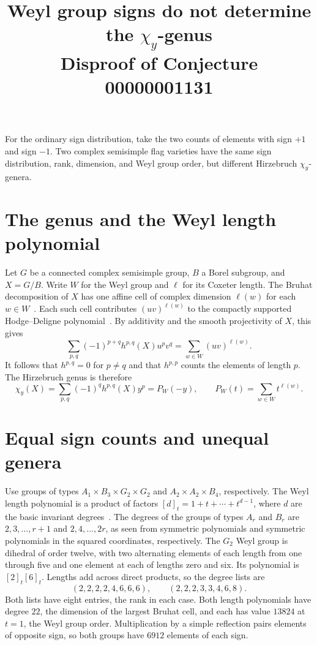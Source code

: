 \documentclass[11pt]{article}
\title{Weyl group signs do not determine the \(\chi_y\)-genus\\[2pt]
  \large Disproof of Conjecture 00000001131}
\author{}
\date{}
\begin{document}
\maketitle

\noindent
For the ordinary sign distribution, take the two counts of elements with
sign $+1$ and sign $-1$. Two complex semisimple flag varieties have the
same sign distribution, rank, dimension, and Weyl group order, but
different Hirzebruch $\chi_y$-genera.

\section*{The genus and the Weyl length polynomial}

Let $G$ be a connected complex semisimple group, $B$ a Borel subgroup,
and $X=G/B$. Write $W$ for the Weyl group and $\ell$ for its Coxeter
length. The Bruhat decomposition of $X$ has one affine cell of complex
dimension $\ell(w)$ for each $w\in W$~\cite[\S8.3]{springer}. Each such
cell contributes $(uv)^{\ell(w)}$ to the compactly supported
Hodge--Deligne polynomial~\cite[Example~3.5]{mustata}. By additivity and
the smooth projectivity of $X$, this gives
\[
 \sum_{p,q}(-1)^{p+q}h^{p,q}(X)u^pv^q
    =\sum_{w\in W}(uv)^{\ell(w)}.
\]
It follows that $h^{p,q}=0$ for $p\ne q$ and that $h^{p,p}$ counts the
elements of length $p$. The Hirzebruch genus is therefore
\[
 \chi_y(X)=\sum_{p,q}(-1)^q h^{p,q}(X)y^p
          =P_W(-y),\qquad P_W(t)=\sum_{w\in W}t^{\ell(w)}.
\]

\section*{Equal sign counts and unequal genera}

Use groups of types $A_1\times B_3\times G_2\times G_2$ and
$A_2\times A_2\times B_4$, respectively. The Weyl length polynomial is a
product of factors $[d]_t=1+t+\cdots+t^{d-1}$, where $d$ are the basic
invariant degrees~\cite[\S3.15]{humphreys}. The degrees of the groups of
types $A_r$ and $B_r$ are $2,3,\ldots,r+1$ and $2,4,\ldots,2r$, as seen
from symmetric polynomials and symmetric polynomials in the squared
coordinates, respectively. The $G_2$ Weyl group is dihedral of order
twelve, with two alternating elements of each length from one through
five and one element at each of lengths zero and six. Its polynomial is
$[2]_t[6]_t$. Lengths add across direct products, so the degree lists are
\[
  (2,2,2,2,4,6,6,6),\qquad (2,2,2,3,3,4,6,8).
\]
Both lists have eight entries, the rank in each case. Both length
polynomials have degree $22$, the dimension of the largest Bruhat cell,
and each has value $13824$ at $t=1$, the Weyl group order. Multiplication
by a simple reflection pairs elements of opposite sign, so both groups
have $6912$ elements of each sign.
\end{document}
